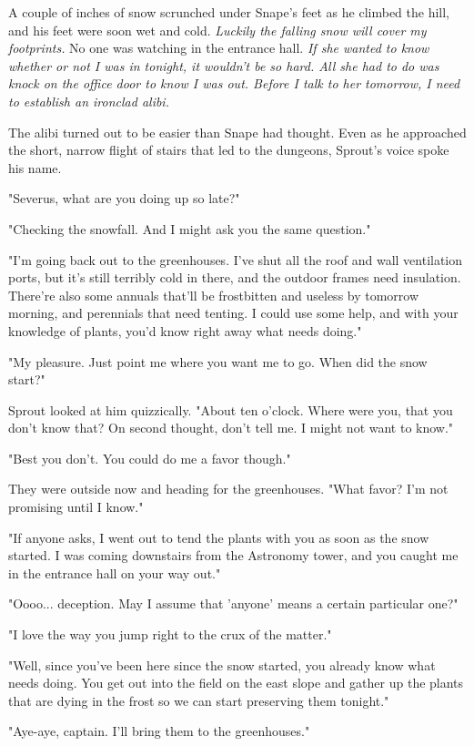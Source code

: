 \documentclass[a4paper,11pt]{article}
\begin{document}
A couple of inches of snow scrunched under Snape's feet as he climbed the hill, and his feet were soon wet and cold. \emph{Luckily the falling snow will cover my footprints.} No one was watching in the entrance hall. \emph{If she wanted to know whether or not I was in tonight, it wouldn't be so hard. All she had to do was knock on the office door to know I was out. Before I talk to her tomorrow, I need to establish an ironclad alibi.}

The alibi turned out to be easier than Snape had thought. Even as he approached the short, narrow flight of stairs that led to the dungeons, Sprout's voice spoke his name.

"Severus, what are you doing up so late?"

"Checking the snowfall. And I might ask you the same question."

"I'm going back out to the greenhouses. I've shut all the roof and wall ventilation ports, but it's still terribly cold in there, and the outdoor frames need insulation. There're also some annuals that'll be frostbitten and useless by tomorrow morning, and perennials that need tenting. I could use some help, and with your knowledge of plants, you'd know right away what needs doing."

"My pleasure. Just point me where you want me to go. When did the snow start?"

Sprout looked at him quizzically. "About ten o'clock. Where were you, that you don't know that? On second thought, don't tell me. I might not want to know."

"Best you don't. You could do me a favor though."

They were outside now and heading for the greenhouses. "What favor? I'm not promising until I know."

"If anyone asks, I went out to tend the plants with you as soon as the snow started. I was coming downstairs from the Astronomy tower, and you caught me in the entrance hall on your way out."

"Oooo... deception. May I assume that 'anyone' means a certain particular one?"

"I love the way you jump right to the crux of the matter."

"Well, since you've been here since the snow started, you already know what needs doing. You get out into the field on the east slope and gather up the plants that are dying in the frost so we can start preserving them tonight."

"Aye-aye, captain. I'll bring them to the greenhouses."
\end{document}
